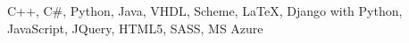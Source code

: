 \vspace{-\acvSectionContentTopSkip}
\vspace{-\acvSectionContentTopSkip}
\vspace{\acvSectionContentTopSkip}
\vspace{\acvSectionContentTopSkip}
\begin{cvskills}
	 {C++, C\#, Python, Java, VHDL, Scheme, LaTeX, Django with Python, JavaScript, JQuery, HTML5, SASS, MS Azure}
  \end{cvskills}


